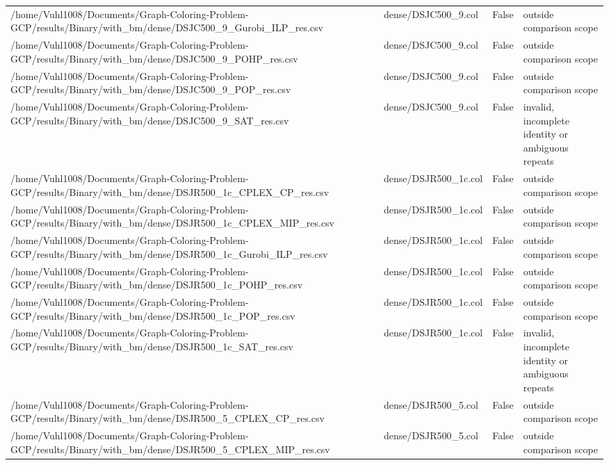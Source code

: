 \begin{table}[htbp]
\begin{tabular}{llll}
/home/Vuhl1008/Documents/Graph-Coloring-Problem-GCP/results/Binary/with\_bm/dense/DSJC500\_9\_Gurobi\_ILP\_res.csv & dense/DSJC500\_9.col & False & outside comparison scope \\
/home/Vuhl1008/Documents/Graph-Coloring-Problem-GCP/results/Binary/with\_bm/dense/DSJC500\_9\_POHP\_res.csv & dense/DSJC500\_9.col & False & outside comparison scope \\
/home/Vuhl1008/Documents/Graph-Coloring-Problem-GCP/results/Binary/with\_bm/dense/DSJC500\_9\_POP\_res.csv & dense/DSJC500\_9.col & False & outside comparison scope \\
/home/Vuhl1008/Documents/Graph-Coloring-Problem-GCP/results/Binary/with\_bm/dense/DSJC500\_9\_SAT\_res.csv & dense/DSJC500\_9.col & False & invalid, incomplete identity or ambiguous repeats \\
/home/Vuhl1008/Documents/Graph-Coloring-Problem-GCP/results/Binary/with\_bm/dense/DSJR500\_1c\_CPLEX\_CP\_res.csv & dense/DSJR500\_1c.col & False & outside comparison scope \\
/home/Vuhl1008/Documents/Graph-Coloring-Problem-GCP/results/Binary/with\_bm/dense/DSJR500\_1c\_CPLEX\_MIP\_res.csv & dense/DSJR500\_1c.col & False & outside comparison scope \\
/home/Vuhl1008/Documents/Graph-Coloring-Problem-GCP/results/Binary/with\_bm/dense/DSJR500\_1c\_Gurobi\_ILP\_res.csv & dense/DSJR500\_1c.col & False & outside comparison scope \\
/home/Vuhl1008/Documents/Graph-Coloring-Problem-GCP/results/Binary/with\_bm/dense/DSJR500\_1c\_POHP\_res.csv & dense/DSJR500\_1c.col & False & outside comparison scope \\
/home/Vuhl1008/Documents/Graph-Coloring-Problem-GCP/results/Binary/with\_bm/dense/DSJR500\_1c\_POP\_res.csv & dense/DSJR500\_1c.col & False & outside comparison scope \\
/home/Vuhl1008/Documents/Graph-Coloring-Problem-GCP/results/Binary/with\_bm/dense/DSJR500\_1c\_SAT\_res.csv & dense/DSJR500\_1c.col & False & invalid, incomplete identity or ambiguous repeats \\
/home/Vuhl1008/Documents/Graph-Coloring-Problem-GCP/results/Binary/with\_bm/dense/DSJR500\_5\_CPLEX\_CP\_res.csv & dense/DSJR500\_5.col & False & outside comparison scope \\
/home/Vuhl1008/Documents/Graph-Coloring-Problem-GCP/results/Binary/with\_bm/dense/DSJR500\_5\_CPLEX\_MIP\_res.csv & dense/DSJR500\_5.col & False & outside comparison scope \\

\end{tabular}
\end{table}
